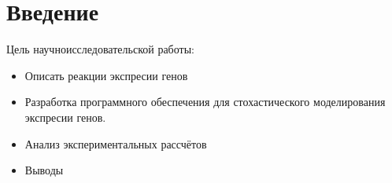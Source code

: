 \section*{Введение}
Цель научноисследовательской работы:
\begin{itemize}
    \item Описать реакции экспресии генов
    \item Разработка программного обеспечения для стохастического моделирования
    экспресии генов.
    \item Анализ экспериментальных рассчётов
    \item Выводы
\end{itemize}
